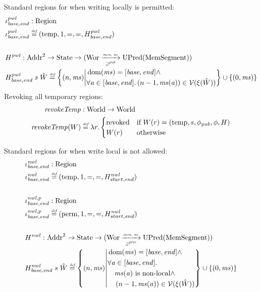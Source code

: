 \documentclass[a4paper]{article}
\newcommand{\fun}{\rightarrow}
\newcommand{\defeq}{\stackrel{\textit{\tiny{def}}}{=}}
\newcommand{\union}{\mathbin{\cup}}
\DeclareMathOperator{\dom}{dom}
\newcommand{\var}[1]{\mathit{#1}}
\newcommand{\hs}{\var{ms}}
\newcommand{\ms}{\hs}
\newcommand{\addr}{\var{a}}
\newcommand{\start}{\var{base}}
\newcommand{\addrend}{\var{end}}
\newcommand{\nwl}{\var{nwl}}
\newcommand{\pwl}{\var{pwl}}
\newcommand{\plainfun}[2]{
  \ifthenelse{\equal{#2}{}}
  {\mathit{#1}}
  {\mathit{#1}(#2)}
}
\newcommand{\revokeTemp}[1]{\plainfun{revokeTemp}{#1}}
\newcommand{\pub}{\var{pub}}
\newcommand{\futurewk}{\mathbin{\sqsupseteq}^{\var{pub}}}
\newcommand{\futurestr}{\mathbin{\sqsupseteq}^{\var{priv}}}
\newcommand{\monwknefun}{\xrightarrow[\text{\tiny{$\futurewk$}}]{\textit{\tiny{mon, ne}}}}
\newcommand{\monstrnefun}{\xrightarrow[\text{\tiny{$\futurestr$}}]{\textit{\tiny{mon, ne}}}}
\newcommand{\asmType}{\plaindom{AsmType}}
\newcommand{\plaindom}[1]{\mathrm{#1}}
\newcommand{\Addrs}{\plaindom{Addr}}
\newcommand{\HeapSegments}{\plaindom{MemSegment}}
\newcommand{\States}{\plaindom{State}}
\newcommand{\Regions}{\plaindom{Region}}
\newcommand{\Worlds}{\plaindom{World}}
\newcommand{\Wor}{\plaindom{Wor}}
\newcommand{\UPred}[1]{\plaindom{UPred}(#1)}
\newcommand{\intr}[2]{\mathcal{#1}}
\newcommand{\valueintr}[1]{\intr{V}{#1}}
\newcommand{\stdvr}{\valueintr{\asmType}}
\newcommand{\npair}[2][n]{\left(#1,#2 \right)}
\newcommand{\plainview}[1]{\mathrm{#1}}
\newcommand{\perma}{\plainview{perm}}
\newcommand{\temp}{\plainview{temp}}
\newcommand{\revoked}{\plainview{revoked}}
\newcommand{\nonlocal}[1]{\ensuremath{#1} \text{ is non-local}}
\begin{document}
Standard regions for when writing locally is permitted:
\begin{align*}
  &\iota_{\start,\addrend}^\pwl : \Regions\\
  &\iota_{\start,\addrend}^\pwl \defeq (\temp,1,=,=,H^\pwl_{\start,\addrend}) \\
  \\
  &H^\pwl : \Addrs^2 \fun \States \fun (\Wor \monwknefun \UPred{\HeapSegments})\\
  &H^\pwl_{\start,\addrend}\; s \; \hat{W} \defeq \left\{\npair{\hs} \middle|
    \begin{aligned}
      &\dom(\hs) = [\start,\addrend] \land \\
      &\forall \addr \in [\start,\addrend] \ldotp \npair[n-1]{\hs(\addr)} \in \stdvr(\xi(\hat{W}))
    \end{aligned}
        \right\} \union \{\npair[0]{\ms} \}
\end{align*}
Revoking all temporary regions:
\begin{align*}
  \revokeTemp{} & : \Worlds \fun \Worlds \\
  \revokeTemp{W} & \defeq \lambda r \ldotp 
                   \begin{cases}
                     \revoked            & \text{if }W(r) = (\temp,s,\phi_\pub,\phi,H) \\
                     W(r)                & \text{otherwise}
                   \end{cases}
\end{align*}
\newcommand{\wrev}[1]{\revokeTemp{#1}}


Standard regions for when write local is not allowed:
\begin{align*}
  &\iota_{\start,\addrend}^{\nwl} : \Regions \\
  &\iota_{\start,\addrend}^{\nwl} \defeq (\temp,1,=,=,H^\nwl_{start,\addrend}) \\
  \\
  &\iota_{\start,\addrend}^{\nwl,p} : \Regions \\
  &\iota_{\start,\addrend}^{\nwl,p} \defeq (\perma,1,=,=,H^\nwl_{start,\addrend})\\
  \\
  &H^\nwl : \Addrs^2 \fun \States \fun (\Wor \monstrnefun \UPred{\HeapSegments})\\
  &H^\nwl_{\start,\addrend} \; s \;\hat{W} \defeq \left\{\npair{\hs} \middle|
    \begin{aligned}
      &\dom(\hs) = [\start,\addrend] \land \\
      &\forall \addr \in [\start,\addrend] \ldotp \\
      &\quad \nonlocal{\ms(\addr)} \land\\ 
      &\quad \npair[n-1]{\hs(\addr)} \in \stdvr(\xi(\hat{W}))
    \end{aligned}
        \right\} \union \{\npair[0]{\ms} \}
\end{align*}
\end{document}
